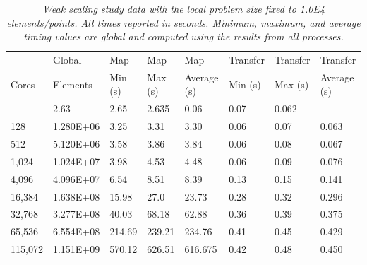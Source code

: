 \documentclass{mc2013}
\begin{document}
\begin{table}[htpb!]
  \begin{center}
    \begin{tabular}{llllllll}\hline\hline
      \multicolumn{1}{l}{} & \multicolumn{1}{l}{Global} &
      \multicolumn{1}{l}{Map} & \multicolumn{1}{l}{Map} &
      \multicolumn{1}{l}{Map} & \multicolumn{1}{l}{Transfer} &
      \multicolumn{1}{l}{Transfer} &
      \multicolumn{1}{l}{Transfer}\\ \multicolumn{1}{l}{Cores} &
      \multicolumn{1}{l}{Elements} & \multicolumn{1}{l}{Min (s)} &
      \multicolumn{1}{l}{Max (s)} & \multicolumn{1}{l}{Average (s)} &
      \multicolumn{1}{l}{Min (s)} & \multicolumn{1}{l}{Max (s)} &
      \multicolumn{1}{l}{Average (s)}\\ \hline\hline %
      & 2.63 & 2.65 & 2.635 & 0.06 & 0.07 & 0.062 \\ 128 & 1.280E+06 &
      3.25 & 3.31 & 3.30 & 0.06 & 0.07 & 0.063 \\ 512 & 5.120E+06 &
      3.58 & 3.86 & 3.84 & 0.06 & 0.08 & 0.067 \\ 1,024 & 1.024E+07 &
      3.98 & 4.53 & 4.48 & 0.06 & 0.09 & 0.076 \\ 4,096 & 4.096E+07 &
      6.54 & 8.51 & 8.39 & 0.13 & 0.15 & 0.141 \\ 16,384 & 1.638E+08 &
      15.98 & 27.0 & 23.73 & 0.28 & 0.32 & 0.296 \\ 32,768 & 3.277E+08
      & 40.03 & 68.18 & 62.88 & 0.36 & 0.39 & 0.375 \\ 65,536 &
      6.554E+08 & 214.69 & 239.21 & 234.76 & 0.41 & 0.45 & 0.429
      \\ 115,072 & 1.151E+09 & 570.12 & 626.51 & 616.675 & 0.42 & 0.48
      & 0.450 \\ \hline\hline
    \end{tabular}
  \end{center}
  \caption{\sl Weak scaling study data with the local problem size
    fixed to 1.0E4 elements/points. All times reported in
    seconds. Minimum, maximum, and average timing values are global
    and computed using the results from all processes.}
  \label{tab:weak_scaling}
\end{table}
\end{document}
